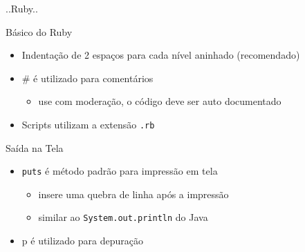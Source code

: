 \begin{frame}[fragile,t]{..Ruby..}
		
\end{frame}
\begin{frame}[fragile,t]{Básico do Ruby}
  \begin{itemize}
    \item Indentação de \alert{2 espaços} para cada nível aninhado (\alert{recomendado})
    \item \# é utilizado para comentários
    \begin{itemize}
    	\item use com moderação, o código deve ser \alert{auto documentado}
    \end{itemize}
    \item Scripts utilizam a extensão \verb!.rb! 
		
  \end{itemize}   
\end{frame}
\begin{frame}[fragile,t]{Saída na Tela}
  \begin{itemize}
    \item \verb!puts! é método \alert{padrão} para impressão em tela 
    \begin{itemize}
    	\item insere uma quebra de linha após a impressão
    	\item similar ao \verb!System.out.println! do Java
    \end{itemize}
    \item \alert{p} é utilizado para depuração
  \end{itemize}   
\end{frame}
